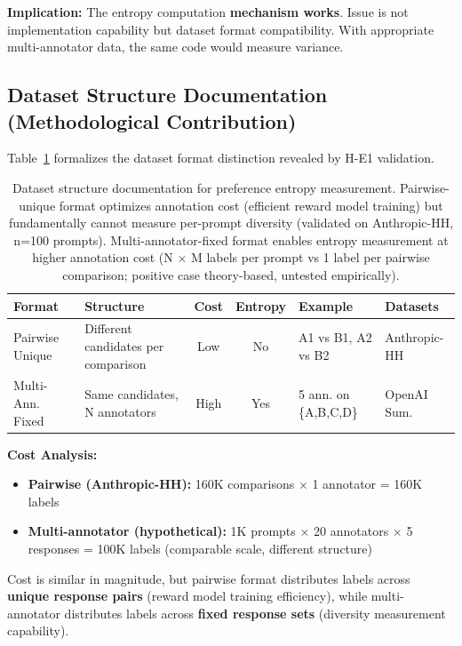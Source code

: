 \textbf{Implication:} The entropy computation \textbf{mechanism works}. Issue is not implementation capability but dataset format compatibility. With appropriate multi-annotator data, the same code would measure variance.

\subsection{Dataset Structure Documentation (Methodological Contribution)}

Table~\ref{tab:dataset-formats-detailed} formalizes the dataset format distinction revealed by H-E1 validation.

\begin{table}[t]
\centering
\caption{Dataset structure documentation for preference entropy measurement. Pairwise-unique format optimizes annotation cost (efficient reward model training) but fundamentally cannot measure per-prompt diversity (validated on Anthropic-HH, n=100 prompts). Multi-annotator-fixed format enables entropy measurement at higher annotation cost (N $\times$ M labels per prompt vs 1 label per pairwise comparison; positive case theory-based, untested empirically).}
\label{tab:dataset-formats-detailed}
\begin{tabular}{lp{3cm}ccp{2.5cm}p{2cm}}
\toprule
\textbf{Format} & \textbf{Structure} & \textbf{Cost} & \textbf{Entropy} & \textbf{Example} & \textbf{Datasets} \\
\midrule
Pairwise Unique & Different candidates per comparison & Low & No & A1 vs B1, A2 vs B2 & Anthropic-HH \\
Multi-Ann. Fixed & Same candidates, N annotators & High & Yes & 5 ann. on \{A,B,C,D\} & OpenAI Sum. \\
\bottomrule
\end{tabular}
\end{table}

\textbf{Cost Analysis:}
\begin{itemize}
\item \textbf{Pairwise (Anthropic-HH):} 160K comparisons $\times$ 1 annotator = 160K labels
\item \textbf{Multi-annotator (hypothetical):} 1K prompts $\times$ 20 annotators $\times$ 5 responses = 100K labels (comparable scale, different structure)
\end{itemize}

Cost is similar in magnitude, but pairwise format distributes labels across \textbf{unique response pairs} (reward model training efficiency), while multi-annotator distributes labels across \textbf{fixed response sets} (diversity measurement capability).

